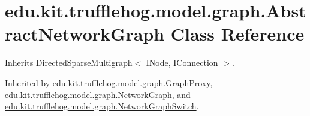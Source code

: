 \hypertarget{classedu_1_1kit_1_1trufflehog_1_1model_1_1graph_1_1_abstract_network_graph}{}\section{edu.\+kit.\+trufflehog.\+model.\+graph.\+Abstract\+Network\+Graph Class Reference}
\label{classedu_1_1kit_1_1trufflehog_1_1model_1_1graph_1_1_abstract_network_graph}


Inherits Directed\+Sparse\+Multigraph$<$ I\+Node, I\+Connection $>$.



Inherited by \hyperlink{classedu_1_1kit_1_1trufflehog_1_1model_1_1graph_1_1_graph_proxy}{edu.\+kit.\+trufflehog.\+model.\+graph.\+Graph\+Proxy}, \hyperlink{classedu_1_1kit_1_1trufflehog_1_1model_1_1graph_1_1_network_graph}{edu.\+kit.\+trufflehog.\+model.\+graph.\+Network\+Graph}, and \hyperlink{classedu_1_1kit_1_1trufflehog_1_1model_1_1graph_1_1_network_graph_switch}{edu.\+kit.\+trufflehog.\+model.\+graph.\+Network\+Graph\+Switch}.

